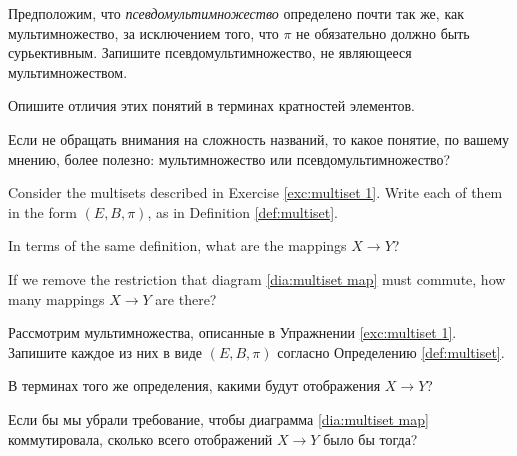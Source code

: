 \documentclass[CT4S-EN-RU]{subfiles}
\begin{document}
\begin{exerciseRUS}
Предположим, что {\em псевдомультимножество} определено почти так же, как мультимножество, за исключением того, что $\pi$ не обязательно должно быть сурьективным. 
\sexc Запишите псевдомультимножество, не являющееся мультимножеством. 
\item Опишите отличия этих понятий в терминах кратностей элементов. 
\item Если не обращать внимания на сложность названий, то какое понятие, по вашему мнению, более полезно: мультимножество или псевдомультимножество? 
\endsexc
\end{exerciseRUS}

\begin{exerciseENG}
Consider the multisets described in Exercise \ref{exc:multiset 1}. 
\sexc Write each of them in the form $(E,B,\pi)$, as in Definition \ref{def:multiset}. 
\item In terms of the same definition, what are the mappings $X\to Y$? 
\item If we remove the restriction that diagram \ref{dia:multiset map} must commute, how many mappings $X\to Y$ are there?
\endsexc
\end{exerciseENG}

\begin{exerciseRUS}
Рассмотрим мультимножества, описанные в Упражнении \ref{exc:multiset 1}. 
\sexc Запишите каждое из них в виде $(E,B,\pi)$ согласно Определению \ref{def:multiset}. 
\item В терминах того же определения, какими будут отображения $X\to Y$? 
\item Если бы мы убрали требование, чтобы диаграмма \ref{dia:multiset map} коммутировала, сколько всего отображений $X\to Y$ было бы тогда?
\endsexc
\end{exerciseRUS}
\end{document}
